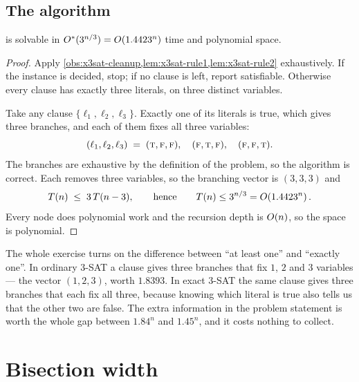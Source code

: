 \subsection{The algorithm}

\begin{theorem}\label{thm:x3sat}
 is solvable in $O^{*}(3^{n/3}) =
O\!\left(1.4423^n\right)$ time and polynomial space.
\end{theorem}

\begin{proof}
Apply \cref{obs:x3sat-cleanup,lem:x3sat-rule1,lem:x3sat-rule2} exhaustively. If
the instance is decided, stop; if no clause is left, report satisfiable.
Otherwise every clause has exactly three literals, on three distinct variables.

Take any clause $\{\ell_1, \ell_2, \ell_3\}$. Exactly one of its literals is
true, which gives three branches, and each of them fixes all three variables:
\[ (\ell_1, \ell_2, \ell_3) \;=\;
   (\textsc{t},\textsc{f},\textsc{f}), \quad
   (\textsc{f},\textsc{t},\textsc{f}), \quad
   (\textsc{f},\textsc{f},\textsc{t}). \]
The branches are exhaustive by the definition of the problem, so the algorithm
is correct. Each removes three variables, so the branching vector is $(3,3,3)$
and
\[ T(n) \;\le\; 3\,T(n-3), \qquad\text{hence}\qquad
   T(n) \le 3^{n/3} = O\!\left(1.4423^n\right). \]
Every node does polynomial work and the recursion depth is $O\!\left(n\right)$, so the
space is polynomial.
\end{proof}

\begin{intuition}
The whole exercise turns on the difference between ``at least one'' and
``exactly one''. In ordinary $3$-SAT a clause gives three branches that fix
$1$, $2$ and $3$ variables --- the vector $(1,2,3)$, worth $1.8393$. In exact
$3$-SAT the same clause gives three branches that each fix all three, because
knowing which literal is true also tells us that the other two are false. The
extra information in the problem statement is worth the whole gap between
$1.84^n$ and $1.45^n$, and it costs nothing to collect.
\end{intuition}

\section{Bisection width}
\label{sec:bisection-width}

